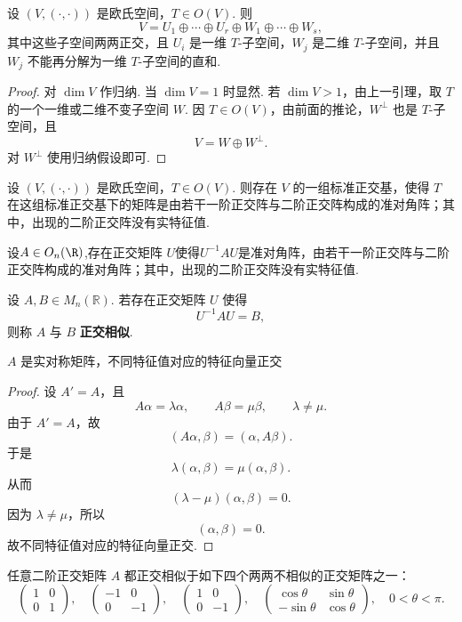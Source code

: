 \begin{lemma}
	设 $(V,(\cdot,\cdot))$ 是欧氏空间，$T\in O(V)$. 则
	\[
	V=U_1\oplus\cdots\oplus U_r\oplus W_1\oplus\cdots\oplus W_s,
	\]
	其中这些子空间两两正交，且 $U_i$ 是一维 $T$-子空间，$W_j$ 是二维 $T$-子空间，并且 $W_j$ 不能再分解为一维 $T$-子空间的直和.
\end{lemma}
\begin{proof}
	对 $\dim V$ 作归纳. 当 $\dim V=1$ 时显然. 若 $\dim V>1$，由上一引理，取 $T$ 的一个一维或二维不变子空间 $W$. 因 $T\in O(V)$，由前面的推论，$W^\perp$ 也是 $T$-子空间，且
	\[
	V=W\oplus W^\perp.
	\]
	对 $W^\perp$ 使用归纳假设即可.
\end{proof}

\begin{corollary}
	设 $(V,(\cdot,\cdot))$ 是欧氏空间，$T\in O(V)$. 则存在 $V$ 的一组标准正交基，使得 $T$ 在这组标准正交基下的矩阵是由若干一阶正交阵与二阶正交阵构成的准对角阵；其中，出现的二阶正交阵没有实特征值.
\end{corollary}
\begin{corollary}
	设$A\in O_n(\R)$,存在正交矩阵 $U$使得$ U^{-1}AU$是准对角阵，由若干一阶正交阵与二阶正交阵构成的准对角阵；其中，出现的二阶正交阵没有实特征值.

\end{corollary}
\begin{definition}
	设 $A,B\in M_n(\mathbb{R})$. 若存在正交矩阵 $U$ 使得
	\[
	U^{-1}AU=B,
	\]
	则称 $A$ 与 $B$ \textbf{正交相似}.
\end{definition}
\begin{lemma}
	$A$ 是实对称矩阵，不同特征值对应的特征向量正交
\end{lemma}
\begin{proof}
	设 $A'=A$，且
	\[
	A\alpha=\lambda\alpha,\qquad A\beta=\mu\beta,\qquad \lambda\ne\mu.
	\]
	由于 $A'=A$，故
	\[
	(A\alpha,\beta)=(\alpha,A\beta).
	\]
	于是
	\[
	\lambda(\alpha,\beta)=\mu(\alpha,\beta).
	\]
	从而
	\[
	(\lambda-\mu)(\alpha,\beta)=0.
	\]
	因为 $\lambda\ne\mu$，所以
	\[
	(\alpha,\beta)=0.
	\]
	故不同特征值对应的特征向量正交.
\end{proof}
\begin{lemma}
	任意二阶正交矩阵 $A$ 都正交相似于如下四个两两不相似的正交矩阵之一：
		\[
		\begin{pmatrix}
			1&0\\
			0&1
		\end{pmatrix},
		\quad
		\begin{pmatrix}
			-1&0\\
			0&-1
		\end{pmatrix},
		\quad
		\begin{pmatrix}
			1&0\\
			0&-1
		\end{pmatrix},
		\quad
		\begin{pmatrix}
			\cos\theta&\sin\theta\\
			-\sin\theta&\cos\theta
		\end{pmatrix},
		\quad 0<\theta<\pi .
		\]
\end{lemma}


